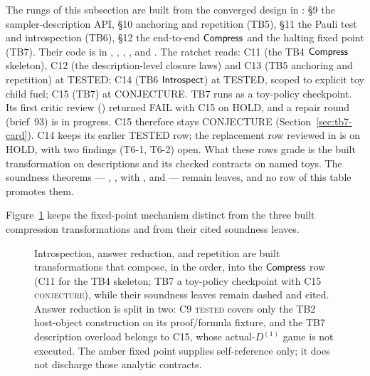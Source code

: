 The rungs of this subsection are built from the converged design in
: \S9 the sampler-description API, \S10 anchoring and
repetition (TB5), \S11 the Pauli test and introspection (TB6), \S12 the
end-to-end \(\mathsf{Compress}\) and the halting fixed point (TB7).  Their code is in
, , ,
,  and .  The
ratchet reads: C11 (the TB4 \(\mathsf{Compress}\) skeleton), C12 (the
description-level closure laws) and C13 (TB5 anchoring and repetition) at
\textsc{TESTED}; C14 (TB6 \(\mathsf{Introspect}\)) at \textsc{TESTED}, scoped to
explicit toy child fuel; C15 (TB7) at \textsc{CONJECTURE}.  TB7 runs as a
toy-policy checkpoint.  Its first critic review ()
returned FAIL with C15 on HOLD, and a repair round (brief~93) is in progress.
C15 therefore stays \textsc{CONJECTURE} (Section~\ref{sec:tb7-card}).  C14
keeps its earlier \textsc{TESTED} row; the replacement row reviewed in
 is on HOLD, with two findings (T6-1, T6-2) open.  What these rows grade is the built
transformation on descriptions and its checked contracts on named toys.  The
soundness theorems --- , ,
 with , and 
--- remain  leaves, and no row of this table promotes them.

Figure~\ref{fig:D-correspondence-compression} keeps the fixed-point mechanism
distinct from the three built compression
transformations and from their cited soundness leaves.
\begin{figure}[H]
\centering

\caption{Introspection, answer reduction, and repetition are built transformations that compose, in the  order, into the \(\mathsf{Compress}\) row (C11 for the TB4 skeleton; TB7 a toy-policy checkpoint with C15 \textsc{conjecture}), while their soundness leaves remain dashed and cited.  Answer reduction is split in two: C9 \textsc{tested} covers only the TB2 host-object construction on its proof/formula fixture, and the TB7 description overload belongs to C15, whose actual-\(D^{(1)}\) game is not executed.  The amber fixed point supplies self-reference only; it does not discharge those analytic contracts.}
\label{fig:D-correspondence-compression}
\end{figure}

